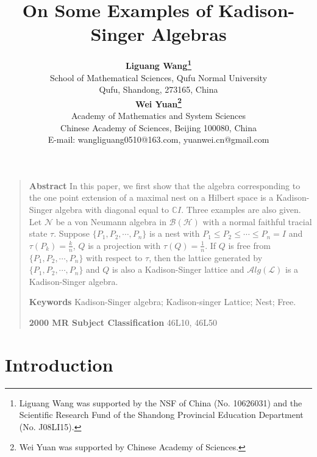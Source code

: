 \documentclass[12pt]{article}
\def\H{{\mathscr{H} }}\def\L{{\mathscr{L}}}
\def\NN{{\mathscr{ N}}}
\newcommand{\BBB}{\mathcal B}
\def\Alg{\mathcal Alg}
\def\C{\mathbb C} %
\begin{document}
\title{\textbf{On Some Examples of Kadison-Singer
Algebras  } }
\author{\textbf{Liguang Wang\thanks{Liguang Wang was supported by the NSF of China (No.
10626031) and the
Scientific Research Fund of the Shandong Provincial Education Department (No. J08LI15). }}\\
{\small School of Mathematical Sciences, Qufu Normal University}\\
{\small Qufu, Shandong, 273165, China} \\
{\textbf{Wei Yuan\thanks{Wei Yuan was supported by Chinese Academy of Sciences. } }}\\
{\small Academy of Mathematics and System Sciences}\\
{\small Chinese Academy of Sciences, Beijing 100080, China} \\
{\small E-mail: wangliguang0510@163.com, yuanwei.cn@gmail.com}}
\date{}
\maketitle \baselineskip=14.2pt \vskip0.1cm

\begin{quote}
\textbf{Abstract} {In this paper, we first show that the algebra
corresponding to the one point extension of a maximal nest on a
Hilbert space is a Kadison-Singer algebra with diagonal equal to $\C
I$. Three examples are also given. Let $\NN$ be a von Neumann algebra in $\BBB(\H)$ with a normal faithful tracial state $\tau$. Suppose  $\{P_1, P_2, \cdots, P_n\}$ is a nest with $ P_1\leq  P_2\leq \cdots \leq  P_n=I$ and $\tau(P_k)=\frac{k}{n}$,  $Q$ is a projection with  $\tau(Q)=\frac{1}{n}$. If $Q$ is free from $\{P_1, P_2, \cdots, P_n\}$ with respect to $\tau$, then the lattice generated by $\{P_1, P_2, \cdots, P_n\}$ and $Q$ is also a Kadison-Singer lattice and $\Alg(\L)$ is a Kadison-Singer algebra.}

\textbf{Keywords} {Kadison-Singer algebra; Kadison-singer Lattice;
Nest; Free. }

{\small} {\small \textbf{2000 MR Subject Classification} 46L10,
46L50}
\end{quote}

\section{Introduction}
\end{document}
